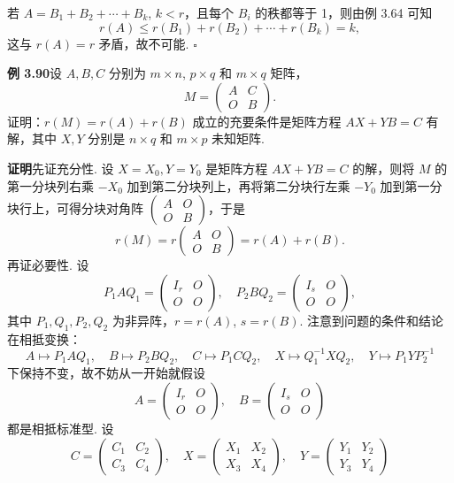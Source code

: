 \documentclass[UTF8, 12pt, fontset=fandol, oneside]{ctexart}
\begin{document}
若 $A=B_1+B_2+\cdots+B_k$, $k<r$，且每个 $B_i$ 的秩都等于 1，则由例 3.64 可知
\[
r(A)\le r(B_1)+r(B_2)+\cdots+r(B_k)=k,
\]
这与 $r(A)=r$ 矛盾，故不可能. $\square$

\noindent\textbf{例 3.90}\quad 设 $A,B,C$ 分别为 $m\times n$, $p\times q$ 和 $m\times q$ 矩阵，
\[
M=\begin{pmatrix}A&C\\O&B\end{pmatrix}.
\]
证明：$r(M)=r(A)+r(B)$ 成立的充要条件是矩阵方程 $AX+YB=C$ 有解，其中 $X,Y$ 分别是 $n\times q$ 和 $m\times p$ 未知矩阵.

\noindent\textbf{证明}\quad 先证充分性. 设 $X=X_0,Y=Y_0$ 是矩阵方程 $AX+YB=C$ 的解，则将 $M$ 的第一分块列右乘 $-X_0$ 加到第二分块列上，再将第二分块行左乘 $-Y_0$ 加到第一分块行上，可得分块对角阵 $\begin{pmatrix}A&O\\O&B\end{pmatrix}$，于是
\[
r(M)=r\begin{pmatrix}A&O\\O&B\end{pmatrix}=r(A)+r(B).
\]
再证必要性. 设
\[
P_1AQ_1=\begin{pmatrix}I_r&O\\O&O\end{pmatrix},\quad
P_2BQ_2=\begin{pmatrix}I_s&O\\O&O\end{pmatrix},
\]
其中 $P_1,Q_1,P_2,Q_2$ 为非异阵，$r=r(A)$, $s=r(B)$. 注意到问题的条件和结论在相抵变换：
\[
A\mapsto P_1AQ_1,\quad B\mapsto P_2BQ_2,\quad C\mapsto P_1CQ_2,\quad
X\mapsto Q_1^{-1}XQ_2,\quad Y\mapsto P_1YP_2^{-1}
\]
下保持不变，故不妨从一开始就假设
\[
A=\begin{pmatrix}I_r&O\\O&O\end{pmatrix},\quad
B=\begin{pmatrix}I_s&O\\O&O\end{pmatrix}
\]
都是相抵标准型. 设
\[
C=\begin{pmatrix}C_1&C_2\\C_3&C_4\end{pmatrix},\quad
X=\begin{pmatrix}X_1&X_2\\X_3&X_4\end{pmatrix},\quad
Y=\begin{pmatrix}Y_1&Y_2\\Y_3&Y_4\end{pmatrix}
\]
\end{document}
